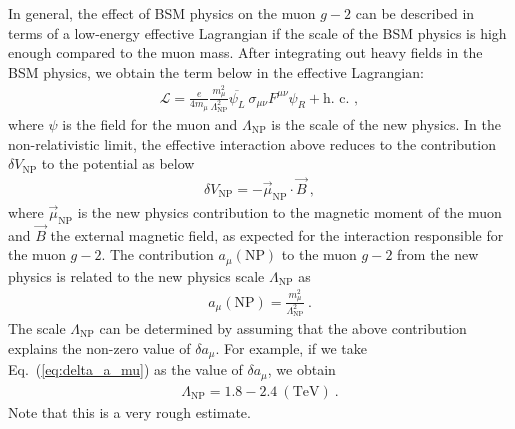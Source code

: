 In general, the effect of BSM physics on the muon $g-2$
can be described in terms of a low-energy effective Lagrangian
if the scale of the BSM physics is high enough compared to the
muon mass.   After integrating out heavy fields in the
BSM physics, we obtain the term below in the effective Lagrangian:
%
\begin{align}
 {\mathcal L} = \frac{e}{4 m_\mu}
 \frac{m_\mu^2}{\Lambda_{\text{NP}}^2} 
 \overline{\psi_L} ~ \sigma_{\mu\nu} F^{\mu\nu} \psi_R + {\text{h.\ c.\ }},
\label{eq:effL_g-2}
\end{align}
%
where $\psi$ is the field for the muon and
$\Lambda_{\text{NP}}$ is the scale of the new physics.
%
%
In the non-relativistic limit, the effective interaction
above reduces to the contribution $\delta V_{\text{NP}}$
to the potential as below
%
\begin{align}
 \delta V_{\text{NP}} = - \vec{\mu}_{\text{NP}} \cdot \vec{B}~,
\end{align}
%
where $\vec{\mu}_{\text{NP}}$ is the new physics
contribution to the magnetic moment of the muon and
$\vec{B}$ the external magnetic field, as expected
for the interaction responsible for the muon $g-2$.
The contribution $a_\mu(\text{NP})$ to the muon $g-2$ from
the new physics is related to the new physics scale
$\Lambda_{\text{NP}}$ as
%
\begin{align}
 a_\mu(\text{NP}) =  \frac{m_\mu^2}{\Lambda_{\text{NP}}^2} ~.
\end{align}
%
The scale $\Lambda_{\text{NP}}$ can be determined 
by assuming that the above contribution explains
the non-zero value of $\delta a_\mu$.  For example,
if we take Eq.~(\ref{eq:delta_a_mu}) as the value of
$\delta a_\mu$, we obtain
%
\begin{align}
 \Lambda_{\text{NP}} = 1.8 - 2.4 ~ (\text{TeV})~.
\end{align}
%
Note that this is a very rough estimate.

